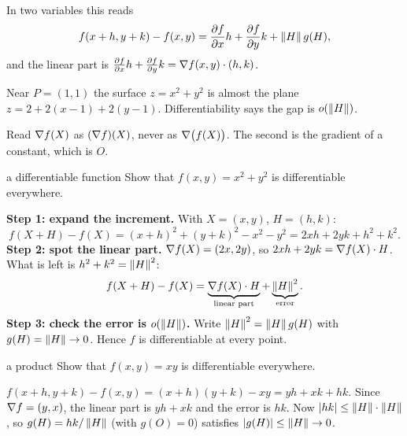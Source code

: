 In two variables this reads
\[
 f(x+h,y+k)-f(x,y)=\frac{\partial f}{\partial x} h+\frac{\partial f}{\partial y} k+\left\lVert H\right\rVert g(H),
\]
and the linear part is $\frac{\partial f}{\partial x} h+\frac{\partial f}{\partial y} k=\nabla f(x,y)\cdot(h,k)$.

\begin{center}

{\small\color{navy} Near $P=(1,1)$ the surface $z=x^2+y^2$ is almost the plane
$z=2+2(x-1)+2(y-1)$. Differentiability says the gap is $o(\left\lVert H\right\rVert)$.}
\end{center}

\begin{trap}
Read $\nabla f(X)$ as $(\nabla f)(X)$, never as $\nabla\big(f(X)\big)$. The second is the
gradient of a constant, which is $O$.
\end{trap}

\begin{example}{a differentiable function}
Show that $f(x,y)=x^2+y^2$ is differentiable everywhere.

\textbf{Step 1: expand the increment.} With $X=(x,y)$, $H=(h,k)$:
\[
f(X+H)-f(X)=(x+h)^2+(y+k)^2-x^2-y^2=2xh+2yk+h^2+k^2 .
\]
\textbf{Step 2: spot the linear part.} $\nabla f(X)=(2x,2y)$, so
$2xh+2yk=\nabla f(X)\cdot H$. What is left is $h^2+k^2=\left\lVert H\right\rVert^2$:
\[
f(X+H)-f(X)=\underbrace{\nabla f(X)\cdot H}_{\text{linear part}}+\underbrace{\left\lVert H\right\rVert^2}_{\text{error}} .
\]
\textbf{Step 3: check the error is $o(\left\lVert H\right\rVert)$.} Write $\left\lVert H\right\rVert^2=\left\lVert H\right\rVert g(H)$ with
$g(H)=\left\lVert H\right\rVert\to0$. Hence $f$ is differentiable at every point.
\end{example}

\begin{example}{a product}
Show that $f(x,y)=xy$ is differentiable everywhere.

$f(x+h,y+k)-f(x,y)=(x+h)(y+k)-xy=yh+xk+hk$. Since $\nabla f=(y,x)$, the linear part is
$yh+xk$ and the error is $hk$. Now $\left\lvert hk\right\rvert\le\left\lVert H\right\rVert\cdot\left\lVert H\right\rVert$, so
$g(H)=hk/\left\lVert H\right\rVert$ (with $g(O)=0$) satisfies $\left\lvert g(H)\right\rvert\le\left\lVert H\right\rVert\to0$.
\end{example}

